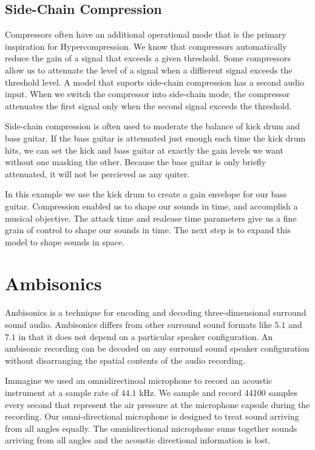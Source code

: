 \subsection{Side-Chain Compression}
\label{sec:side-chain-compr}
Compressors often have an additional operational mode that is the
primary inspiration for Hypercompression. We know that compressors
automatically reduce the gain of a signal that exceeds a given
threshold. Some compressors allow us to attenuate the level of a
signal when a diffierent signal exceeds the threshold level. A model
that suports side-chain compression  has a second audio
input. When we switch the compressor into side-chain mode, the
compressor attenuates the first signal only when the second signal
exceeds the threshold. 

Side-chain compression is often used to moderate the balance of kick
drum and bass guitar. If the bass guitar is attenuated just enough each
time the kick drum hits, we can set the kick and bass guitar at
exactly the gain levels we want without one masking the other. Because
the bass guitar is only briefly attenuated, it will not be percieved
as any quiter. 

In this example we use the kick drum to create a gain envelope for our
bass guitar. Compression enabled us to shape our sounds in time, and
accomplish a musical objective. The attack time and realease time
parameters give us a fine grain of control to shape our sounds in
time. The next step is to expand this model to shape sounds in space.

\section{Ambisonics}
\label{sec:ambisonics}
Ambisonics is a technique for encoding and decoding three-dimensional
surround sound audio.\cite{Gerzon1985} Ambisonics differs from other
surround sound formats like $5.1$ and $7.1$ in that it does not depend
on a particular speaker configuration. An ambisonic recording can be
decoded on any surround sound speaker configuration without
disarranging the spatial contents of the audio recording.

Immagine we used an omnidirectinoal microphone to record an acoustic
instrument at a sample rate of $44.1$ kHz. We sample and record 44100
samples every second that represent the air pressure at the microphone
capsule during the recording. Our omni-directional microphone is
designed to treat sound arriving from all angles equally. The
omnidirectional microphone sums together sounds arriving from all
angles and the acoustic directional information is lost.

